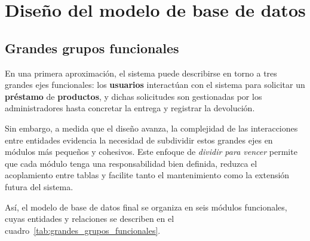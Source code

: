 
\section{Diseño del modelo de base de datos}

\subsection{Grandes grupos funcionales}\label{sec:grandes_grupos}

En una primera aproximación, el sistema puede describirse en torno a tres grandes 
ejes funcionales: los \textbf{usuarios} interactúan con el sistema para solicitar 
un \textbf{préstamo} de \textbf{productos}, y dichas solicitudes son gestionadas 
por los administradores hasta concretar la entrega y registrar la devolución.

Sin embargo, a medida que el diseño avanza, la complejidad de las interacciones 
entre entidades evidencia la necesidad de subdividir estos grandes ejes en módulos 
más pequeños y cohesivos. Este enfoque de \textit{dividir para vencer} permite que 
cada módulo tenga una responsabilidad bien definida, reduzca el acoplamiento entre 
tablas y facilite tanto el mantenimiento como la extensión futura del sistema.

Así, el modelo de base de datos final se organiza en seis módulos funcionales, 
cuyas entidades y relaciones se describen en el cuadro~\ref{tab:grandes_grupos_funcionales}.

